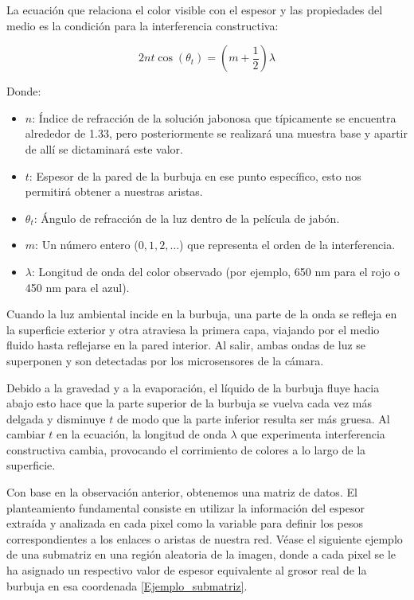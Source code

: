 La ecuación que relaciona el color visible con el espesor y las propiedades del medio es la condición para la interferencia constructiva:

\begin{equation}
2nt\cos(\theta_t) = \left(m + \frac{1}{2}\right)\lambda
\end{equation}

Donde:
\begin{itemize}
    \item $n$: Índice de refracción de la solución jabonosa que típicamente se encuentra alrededor de 1.33, pero posteriormente se realizará una muestra base y apartir de allí se dictaminará este valor.
    \item $t$: Espesor de la pared de la burbuja en ese punto específico, esto nos permitirá obtener a nuestras aristas.
    \item $\theta_t$: Ángulo de refracción de la luz dentro de la película de jabón.
    \item $m$: Un número entero ($0, 1, 2, \dots$) que representa el orden de la interferencia.
    \item $\lambda$: Longitud de onda del color observado (por ejemplo, 650 nm para el rojo o 450 nm para el azul).
\end{itemize}

Cuando la luz ambiental incide en la burbuja, una parte de la onda se refleja en la superficie exterior y otra atraviesa la primera capa, viajando por el medio fluido hasta reflejarse en la pared interior. Al salir, ambas ondas de luz se superponen y son detectadas por los microsensores de la cámara.

Debido a la gravedad y a la evaporación, el líquido de la burbuja fluye hacia abajo esto hace que la parte superior de la burbuja se vuelva cada vez más delgada y disminuye $t$ de modo que la parte inferior resulta ser más gruesa. Al cambiar $t$ en la ecuación, la longitud de onda $\lambda$ que experimenta interferencia constructiva cambia, provocando el corrimiento de colores a lo largo de la superficie.


Con base en la observación anterior, obtenemos una matriz de datos. El planteamiento fundamental consiste en utilizar la información del espesor extraída y analizada en cada pixel como la variable para definir los pesos correspondientes a los enlaces o aristas de nuestra red. Véase el siguiente ejemplo de una submatriz en una región aleatoria de la imagen, donde a cada pixel se le ha asignado un respectivo valor de espesor equivalente al grosor real de la burbuja en esa coordenada \ref{Ejemplo_submatriz}.

